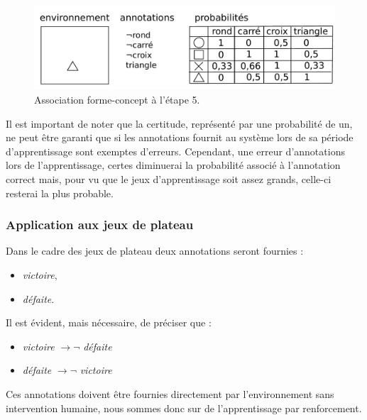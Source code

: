 \begin{figure}[H] 
\includegraphics[width=\textwidth]{files/raisonneur/annotations_5} 
\caption{Association forme-concept à l'étape 5.} 
\label{img_annotations_5}
\end{figure}

Il est important de noter que la certitude, représenté par une probabilité de un, ne peut être garanti que si les annotations fournit au système lors de sa période d'apprentissage sont exemptes d'erreurs. Cependant, une erreur d'annotations lors de l'apprentissage, certes diminuerai la probabilité associé à l'annotation correct mais, pour vu que le jeux d'apprentissage soit assez grands, celle-ci resterai la plus probable.

\subsubsection{Application aux jeux de plateau}

Dans le cadre des jeux de plateau deux annotations seront fournies :
\begin{itemize}
\item \emph{victoire},
\item \emph{défaite}.
\end{itemize}
Il est évident, mais nécessaire, de préciser que :
\begin{itemize}
\item \emph{victoire} $\rightarrow{}\neg{}$ \emph{défaite}
\item \emph{défaite} $\rightarrow{}\neg{}$ \emph{victoire}
\end{itemize}

Ces annotations doivent être fournies directement par l'environnement sans intervention humaine, nous sommes donc sur de l'apprentissage par renforcement.
